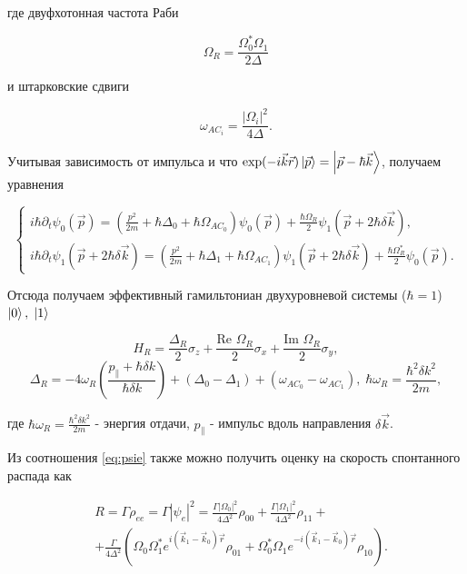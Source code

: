 где двуфхотонная частота Раби

\begin{equation}
	\Omega_{R} = \frac{\Omega_0^* \Omega_1}{2\Delta}
\end{equation}

и штарковские сдвиги

\begin{equation}
	\omega_{AC_i} = \frac{|\Omega_{i}|^2}{4\Delta}.
\end{equation}

Учитывая зависимость от импульса и что $\exp(-i\vec{k}\vec{r})\left| \vec{p} \right\rangle = \left| \vec{p}-\hbar \vec{k} \right\rangle$, получаем уравнения

\begin{equation}
	\begin{cases}
		i\hbar \partial_t \psi_{0}(\vec{p}) = \left(\frac{p^2}{2m} + \hbar \Delta_{0} + \hbar \Omega_{AC_0}\right) \psi_{0}(\vec{p}) + \frac{\hbar \Omega_{R}}{2}\psi_{1}(\vec{p} + 2\hbar \delta\vec{k}), \\
		i\hbar \partial_t \psi_{1}(\vec{p}+2\hbar \delta\vec{k}) = \left(\frac{p^2}{2m} + \hbar \Delta_{1} + \hbar \Omega_{AC_1}\right) \psi_{1}(\vec{p}+2\hbar \delta\vec{k}) + \frac{\hbar \Omega_{R}^*}{2}\psi_{0}(\vec{p}).
	\end{cases}
\end{equation}

Отсюда получаем эффективный гамильтониан двухуровневой системы ($\hbar=1$) $\left| 0 \right\rangle, \; \left| 1 \right\rangle$

\begin{equation}
	H_R = \frac{\Delta_R}{2}\sigma_{z} + \frac{\text{Re }\Omega_{R}}{2}\sigma_{x} + \frac{\text{Im }\Omega_{R}}{2}\sigma_{y},
\end{equation}
\begin{equation}
	\Delta_{R} = -4\omega_{R}\left(\frac{p_{\parallel}+\hbar \delta k}{\hbar \delta k}\right) + (\Delta_0 - \Delta_1) + (\omega_{AC_0} - \omega_{AC_1}), \; \hbar\omega_{R} = \frac{\hbar^2 \delta k ^2}{2m},
\end{equation}

где $\hbar\omega_R = \frac{\hbar^2 \delta k^2}{2m}$ - энергия отдачи, $p_{\parallel}$ - импульс вдоль направления $\delta \vec{k}$. 


Из соотношения \ref{eq:psie} также можно получить оценку на скорость спонтанного распада как

\begin{equation}
	\begin{aligned}
		& R=\Gamma\rho_{ee}=\Gamma\left|\psi_e\right|^2=\frac{\Gamma|\Omega_0|^2}{4\Delta^2}\rho_{00}+\frac{\Gamma|\Omega_1|^2}{4\Delta^2}\rho_{11}+\\
& +\frac{\Gamma}{4\Delta^2}\left(\Omega_0\Omega_1^*e^{i\left(\vec{k}_1-\vec{k}_0\right)\vec{r}}\rho_{01}+\Omega_0^*\Omega_1e^{-i\left(\vec{k}_1-\vec{k}_0\right)\vec{r}}\rho_{10}\right).
	\end{aligned}
	\label{eq:scattering_rate}
\end{equation}

